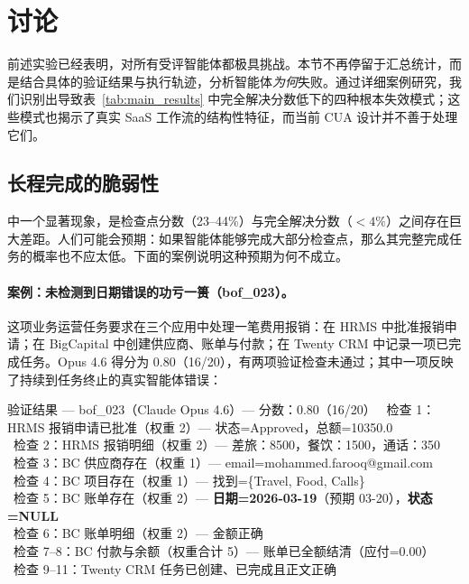 \section{讨论}
\label{disc}

前述实验已经表明，\datasetname 对所有受评智能体都极具挑战。本节不再停留于汇总统计，而是结合具体的验证结果与执行轨迹，分析智能体\emph{为何}失败。通过详细案例研究，我们识别出导致表~\ref{tab:main_results} 中完全解决分数低下的四种根本失效模式；这些模式也揭示了真实 SaaS 工作流的结构性特征，而当前 CUA 设计并不善于处理它们。

\subsection{长程完成的脆弱性}
\label{disc-nearmiss}

\datasetname 中一个显著现象，是检查点分数（23--44\%）与完全解决分数（$<4\%$）之间存在巨大差距。人们可能会预期：如果智能体能够完成大部分检查点，那么其完整完成任务的概率也不应太低。下面的案例说明这种预期为何不成立。

\paragraph{案例：未检测到日期错误的功亏一篑（{\ttfamily bof\_023}）。} 这项业务运营任务要求在三个应用中处理一笔费用报销：在 HRMS 中批准报销申请；在 BigCapital 中创建供应商、账单与付款；在 Twenty CRM 中记录一项已完成任务。Opus 4.6 得分为 0.80（16/20），有两项验证检查未通过；其中一项反映了持续到任务终止的真实智能体错误：

\begin{verifybox}{验证结果 --- {\ttfamily bof\_023}（Claude Opus 4.6）--- 分数：0.80（16/20）}
\small
\cmark\ 检查 1：HRMS 报销申请已批准（权重 2）--- 状态=Approved，总额=10350.0 \\
\cmark\ 检查 2：HRMS 报销明细（权重 2）--- 差旅：8500，餐饮：1500，通话：350 \\
\cmark\ 检查 3：BC 供应商存在（权重 1）--- email=mohammed.farooq@gmail.com \\
\cmark\ 检查 4：BC 项目存在（权重 1）--- 找到=\{Travel, Food, Calls\} \\
\xmark\ 检查 5：BC 账单存在（权重 2）--- \textbf{日期=2026-03-19}（预期 03-20），\textbf{状态=NULL} \\
\cmark\ 检查 6：BC 账单明细（权重 2）--- 金额正确 \\
\cmark\ 检查 7--8：BC 付款与余额（权重合计 5）--- 账单已全额结清（应付=0.00） \\
\cmark\ 检查 9--11：Twenty CRM 任务已创建、已完成且正文正确
\end{verifybox}


